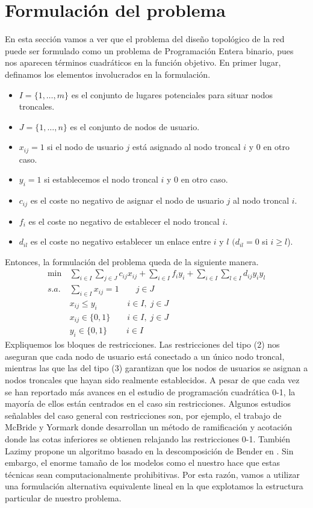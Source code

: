 \documentclass[twoside,12pt]{article}
\begin{document}
\section{Formulación del problema}
En esta sección vamos a ver que el problema del diseño topológico de la red puede ser formulado como un problema de Programación Entera binario, pues nos aparecen términos cuadráticos en la función objetivo. En primer lugar, definamos los elementos involucrados en la formulación.
\begin{itemize}
\item $I=\{1,\dotsc,m\}$ es el conjunto de lugares potenciales para situar nodos troncales.
\item $J=\{1,\dotsc,n\}$ es el conjunto de nodos de usuario.
\item $x_{ij}=1$ si el nodo de usuario $j$ está asignado al nodo troncal $i$ y $0$ en otro caso.
\item $y_i =1$ si establecemos el nodo troncal $i$ y $0$ en otro caso.
\item $c_{ij}$ es el coste no negativo de asignar el nodo de usuario $j$ al nodo troncal $i$.
\item $f_i$ es el coste no negativo de establecer el nodo troncal $i$. 
\item $d_{il}$ es el coste no negativo establecer un enlace entre $i$ y $l$ $(d_{il} = 0$ si $i\geq l$).
\end{itemize}
Entonces, la formulación del problema queda de la siguiente manera.
\begin{align}
\min \,& \sum_{i\in I} \sum_{j\in J} c_{ij}x_{ij} + \sum_{i\in I} f_i y_i + \sum_{i \in I}\sum_{l \in I} d_{ij}y_iy_l\\
s.a.\,& \sum_{i\in I} x_{ij} = 1 \qquad  j \in J\\
& x_{ij}\leq y_i \quad\;\;\qquad i \in I,\; j\in J\\
&x_{ij}\in\{0,1\} \qquad i \in I,\; j\in J\\
&y_i\in\{0,1\} \qquad \;i\in I
\end{align}
Expliquemos los bloques de restricciones. Las restricciones del tipo (2) nos aseguran que cada nodo de usuario está conectado a un único nodo troncal, mientras las que las del tipo (3) garantizan que los nodos de usuarios se asignan a nodos troncales que hayan sido realmente establecidos. A pesar de que cada vez se han reportado más avances en el estudio de programación cuadrática 0-1, la mayoría de ellos están centrados en el caso sin restricciones. Algunos estudios señalables del caso general con restricciones son, por ejemplo, el trabajo de McBride y Yormark \cite{mcbride} donde desarrollan un método  de ramificación y acotación donde las cotas inferiores se obtienen relajando las restricciones 0-1. También Lazimy propone un algoritmo basado en la descomposición de Bender en \cite{lazi}. Sin embargo, el enorme tamaño de los modelos como el nuestro hace que estas técnicas sean computacionalmente prohibitivas. Por esta razón, vamos a utilizar una formulación alternativa equivalente lineal en la que explotamos la estructura particular de nuestro problema.
\end{document}
